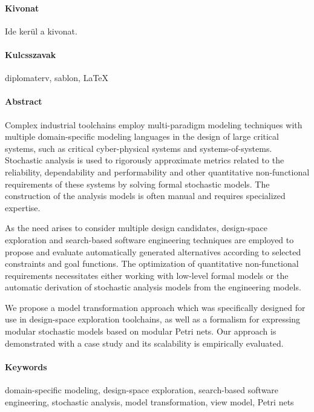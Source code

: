 \begin{otherlanguage}{magyar}
  \paragraph*{Kivonat}
  \thispagestyle{plain}
  
  Ide kerül a kivonat.
  
  \paragraph{Kulcsszavak} diplomaterv, sablon, \LaTeX
\end{otherlanguage}

\vspace*{0pt plus 1fill}

\paragraph*{Abstract}
{}
\thispagestyle{plain}

Complex industrial toolchains employ multi-paradigm modeling techniques with multiple domain-specific modeling languages in the design of large critical systems, such as critical cyber-physical systems and systems-of-systems. Stochastic analysis is used to rigorously approximate metrics related to the reliability, dependability and performability and other quantitative non-functional requirements of these systems by solving formal stochastic models. The construction of the analysis models is often manual and requires specialized expertise.

As the need arises to consider multiple design candidates, design-space exploration and search-based software engineering techniques are employed to propose and evaluate automatically generated alternatives according to selected constraints and goal functions. The optimization of quantitative non-functional requirements necessitates either working with low-level formal models or the automatic derivation of stochastic analysis models from the engineering models.

We propose a model transformation approach which was specifically designed for use in design-space exploration toolchains, as well as a formalism for expressing modular stochastic models based on modular Petri nets. Our approach is demonstrated with a case study and its scalability is empirically evaluated.

\paragraph{Keywords} domain-specific modeling, design-space exploration, search-based software engineering, stochastic analysis, model transformation, view model, Petri nets

